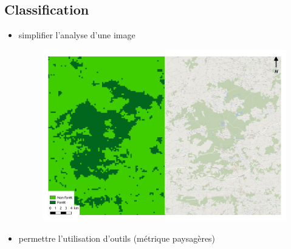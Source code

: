 \documentclass[11pt]{beamer}
\begin{document}
\subsection{Classification}
\begin{frame}{}
\begin{itemize}
\item simplifier l'analyse d'une image
\begin{figure}[!h]
\centering
\includegraphics[scale=0.25]{img/classif_exemple.pdf}
\end{figure}
\item permettre l'utilisation d'outils (métrique paysagères)
\end{itemize}
\end{frame}
\end{document}
